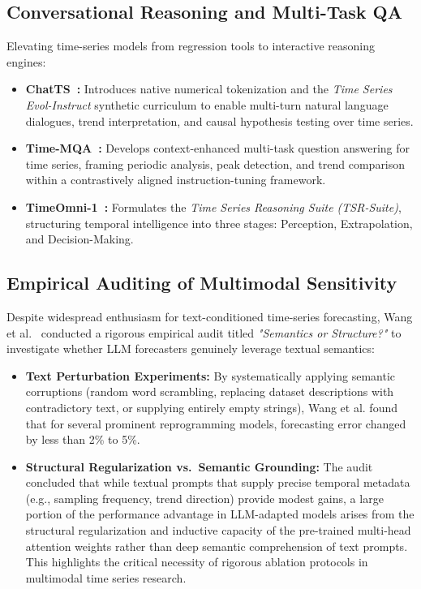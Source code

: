 \subsection{Conversational Reasoning and Multi-Task QA}
Elevating time-series models from regression tools to interactive reasoning engines:
\begin{itemize}
    \item \textbf{ChatTS~\cite{Zhao2024ChatTS}:} Introduces native numerical tokenization and the \textit{Time Series Evol-Instruct} synthetic curriculum to enable multi-turn natural language dialogues, trend interpretation, and causal hypothesis testing over time series.
    \item \textbf{Time-MQA~\cite{Shen2025TimeMQA}:} Develops context-enhanced multi-task question answering for time series, framing periodic analysis, peak detection, and trend comparison within a contrastively aligned instruction-tuning framework.
    \item \textbf{TimeOmni-1~\cite{Tan2025TimeOmni1}:} Formulates the \textit{Time Series Reasoning Suite (TSR-Suite)}, structuring temporal intelligence into three stages: Perception, Extrapolation, and Decision-Making.
\end{itemize}

\subsection{Empirical Auditing of Multimodal Sensitivity}
Despite widespread enthusiasm for text-conditioned time-series forecasting, Wang et al.~\cite{Wang2026AuditingText} conducted a rigorous empirical audit titled \textit{"Semantics or Structure?"} to investigate whether LLM forecasters genuinely leverage textual semantics:
\begin{itemize}
    \item \textbf{Text Perturbation Experiments:} By systematically applying semantic corruptions (random word scrambling, replacing dataset descriptions with contradictory text, or supplying entirely empty strings), Wang et al. found that for several prominent reprogramming models, forecasting error changed by less than 2\% to 5\%.
    \item \textbf{Structural Regularization vs.\ Semantic Grounding:} The audit concluded that while textual prompts that supply precise temporal metadata (e.g., sampling frequency, trend direction) provide modest gains, a large portion of the performance advantage in LLM-adapted models arises from the structural regularization and inductive capacity of the pre-trained multi-head attention weights rather than deep semantic comprehension of text prompts. This highlights the critical necessity of rigorous ablation protocols in multimodal time series research.
\end{itemize}

